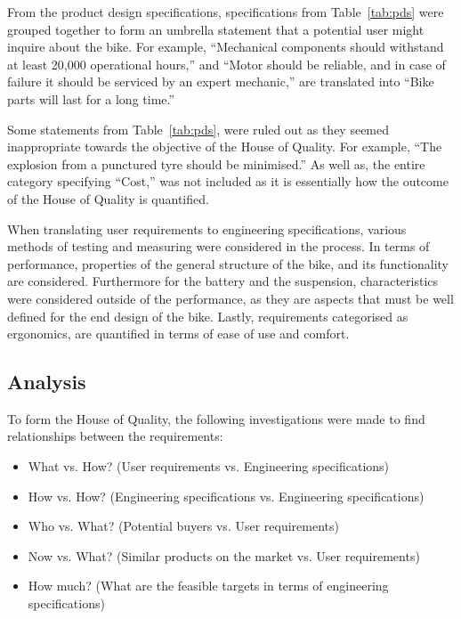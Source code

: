 \documentclass[a4paper,11pt]{article}
\begin{document}
From the product design specifications, specifications from Table~\ref{tab:pds} were grouped together to form an umbrella statement that a potential user might inquire about the bike. For example, ``Mechanical components should withstand at least 20,000 operational hours,'' and ``Motor should be reliable, and in case of failure it should be serviced by an expert mechanic,'' are translated into ``Bike parts will last for a long time.'' 

Some statements from Table~\ref{tab:pds}, were ruled out as they seemed inappropriate towards the objective of the House of Quality. For example, ``The explosion from a punctured tyre should be minimised.'' As well as, the entire category specifying ``Cost,'' was not included as it is essentially how the outcome of the House of Quality is quantified.

When translating user requirements to engineering specifications, various methods of testing and measuring were considered in the process. In terms of performance, properties of the general structure of the bike, and its functionality are considered. Furthermore for the battery and the suspension, characteristics were considered outside of the performance, as they are aspects that must be well defined for the end design of the bike. Lastly, requirements categorised as ergonomics, are quantified in terms of ease of use and comfort.

\subsection{Analysis}

To form the House of Quality, the following investigations were made to find relationships between the requirements:
\begin{itemize}
	\setlength{\itemsep}{0pt}
	\item What vs. How? (User requirements vs. Engineering specifications)
	\item How vs. How? (Engineering specifications vs. Engineering specifications)
	\item Who vs. What? (Potential buyers vs. User requirements)
	\item Now vs. What? (Similar products on the market vs. User requirements)
	\item How much? (What are the feasible targets in terms of engineering specifications)
\end{itemize}
\end{document}
